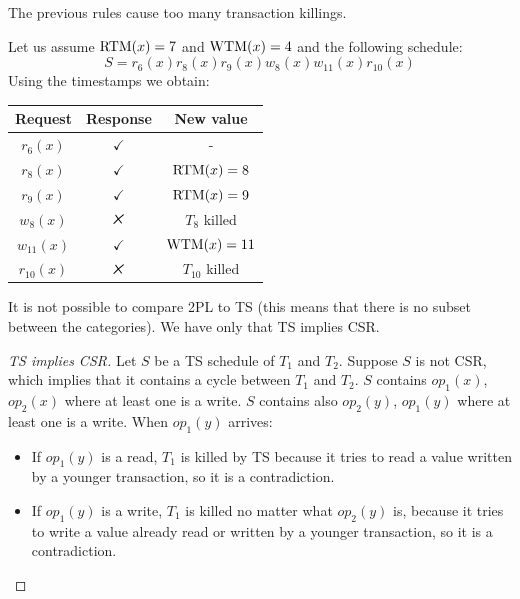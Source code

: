 \documentclass[12pt, a4paper]{report}
\newtheorem[style=M,bodystyle=\normalfont]{theorem}{Theorem}
\newtheorem[style=M,bodystyle=\normalfont]{corollary}{Corollary}
\newtheorem[style=M,bodystyle=\normalfont]{lemma}{Lemma}
\newtheorem[style=M,bodystyle=\normalfont]{definition}{Definition}
\newcommand{\tikzxmark}{%
\tikz[scale=0.23] {
    \draw[line width=0.7,line cap=round] (0,0) to [bend left=6] (1,1);
    \draw[line width=0.7,line cap=round] (0.2,0.95) to [bend right=3] (0.8,0.05);
}}
\begin{document}
    The previous rules cause too many transaction killings. 
    \begin{example}
        Let us assume $\textnormal{RTM}(x)=7$ and $\textnormal{WTM}(x)=4$ and the following schedule: 
        \[S=r_6(x) r_8(x) r_9(x) w_8(x) w_{11}(x) r_{10}(x)\]
        Using the timestamps we obtain: 
        \begin{table}[H]
            \centering
            \begin{tabular}{ccc}
            \textbf{Request} & \textbf{Response} & \textbf{New value} \\ \hline
            $r_6(x)$         & $\checkmark$      & -                  \\
            $r_8(x)$         & $\checkmark$      & $\textnormal{RTM}(x)=8$         \\
            $r_9(x)$         & $\checkmark$      & $\textnormal{RTM}(x)=9$         \\
            $w_8(x)$         & $\tikzxmark$      & $T_8$ killed       \\
            $w_{11}(x)$      & $\checkmark$      & $\textnormal{WTM}(x)=11$        \\
            $r_{10}(x)$      & $\tikzxmark$      & $T_{10}$ killed   
            \end{tabular}
        \end{table}
    \end{example}
    It is not possible to compare 2PL to TS (this means that there is no subset between the categories). We have only that TS implies CSR. 
    \begin{proof}[TS implies CSR]
        Let $S$ be a TS schedule of $T_1$ and $T_2$. Suppose $S$ is not CSR, which implies that it contains a cycle between $T_1$ and $T_2$. $S$ contains $op_1(x)$, $op_2(x)$ where at 
        least one is a write. $S$ contains also $op_2(y)$, $op_1(y)$ where at least one is a write. 
        When $op_1(y)$ arrives:
        \begin{itemize}
            \item If $op_1(y)$ is a read, $T_1$ is killed by TS because it tries to read a value written by a younger transaction, so it is a contradiction. 
            \item If $op_1(y)$ is a write, $T_1$ is killed no matter what $op_2(y)$ is, because it tries to write a value already read or written by a younger transaction, so it is a 
                contradiction. 
        \end{itemize}
    \end{proof}
\end{document}
